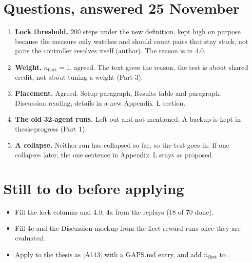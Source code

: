 \documentclass[11pt,a4paper]{article}
\newcommand{\lab}[1]{\textsf{\footnotesize\detokenize{#1}}}
\begin{document}
\section*{Questions, answered 25 November}
\begin{enumerate}
  \item \textbf{Lock threshold.} 200 steps under the new definition, kept
    high on purpose because the measure only watches and should count pairs
    that stay stuck, not pairs the controller resolves itself (author). The
    reason is in 4.0.
  \item \textbf{Weight.} $n_{\mathrm{fleet}} = 1$, agreed. The text gives the
    reason, the test is about shared credit, not about tuning a weight
    (Part 3).
  \item \textbf{Placement.} Agreed. Setup paragraph, Results table and
    paragraph, Discussion reading, details in a new Appendix~L section.
  \item \textbf{The old 32-agent runs.} Left out and not mentioned. A backup
    is kept in thesis-progress (Part 1).
  \item \textbf{A collapse.} Neither run has collapsed so far, so the test
    goes in. If one collapses later, the one sentence in Appendix~L stays as
    proposed.
\end{enumerate}

\section*{Still to do before applying}
\begin{itemize}[nosep]
  \item Fill the lock columns and 4.0, 4a from the replays (18 of 70 done).
  \item Fill 4c and the Discussion mockup from the fleet reward runs once
    they are evaluated.
  \item Apply to the thesis as [A143] with a GAPS.md entry, and add
    $n_{\mathrm{fleet}}$ to \lab{tab:notation}.
\end{itemize}
\end{document}
